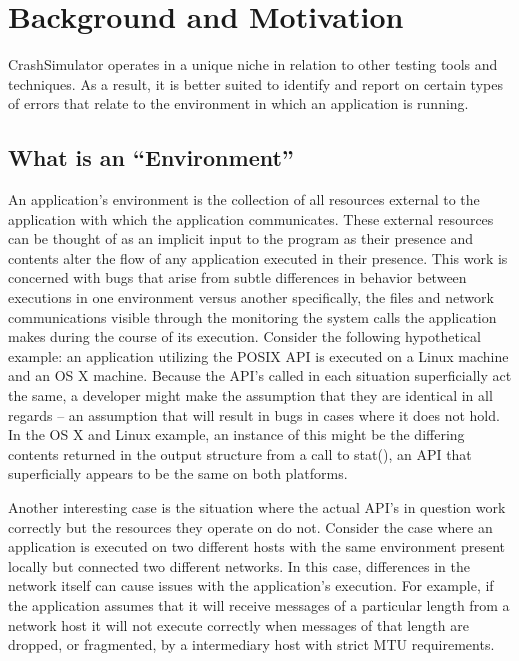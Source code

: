 \section{Background and Motivation}

CrashSimulator operates in a unique niche in relation to other testing tools and techniques. As a result, it is better
suited to identify and report on certain types of errors that relate to the environment in which an application is
running.

    \subsection{What is an ``Environment''}

    An application's environment is the collection of all resources external to the application with which the
    application communicates.  These external resources can be thought of as an implicit input to the program as their
    presence and contents alter the flow of any application executed in their presence.  This work is concerned with
    bugs that arise from subtle differences in behavior between executions in one environment versus another
    specifically, the files and network communications visible through the monitoring the system calls the application
    makes during the course of its execution.  Consider the following hypothetical example: an application utilizing the
    POSIX API is executed on a Linux machine and an OS X machine.  Because the API's called in each situation
    superficially act the same, a developer might make the assumption that they are identical in all regards -- an
    assumption that will result in bugs in cases where it does not hold.  In the OS X and Linux example, an instance of
    this might be the differing contents returned in the output structure from a call to stat(), an API that
    superficially appears to be the same on both platforms.

    Another interesting case is the situation where the actual API's in question work correctly but the resources they
    operate on do not.  Consider the case where an application is executed on two different hosts with the same
    environment present locally but connected two different networks.  In this case, differences in the network itself
    can cause issues with the application's execution.  For example, if the application assumes that it will receive
    messages of a particular length from a network host it will not execute correctly when messages of that length are
    dropped, or fragmented, by a intermediary host with strict MTU requirements.

